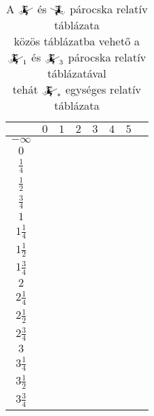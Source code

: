 \documentclass{article}
\newcommand{\blk}{\cellcolor{darkgray}}
\newcommand{\red}{\cellcolor{red!33}}
\newcommand{\grn}{\cellcolor{green!33}}
\newcommand{\nothing}{\text{\raisebox{0.4em}{\rotatebox{180}{$\curvearrowleft$}}}}%
\newcommand{\just}[1]{\boxed{#1}}%
\newcommand{\incl}{\mathbf{incl}}
\newcommand{\excl}{\mathbf{excl}}
\newcommand{\currymainfun}[1]{\mathwitch_{#1}}
\newcommand{\currymainfunA}{\mathwitch}
\newcommand{\currymainfunB}{\reversemathwitch}
\begin{document}
	\begin{table}[H]
		\caption*{A $\currymainfunA$ és $\currymainfunB$ párocska relatív táblázata\\közös táblázatba vehető a $\currymainfun1$ és $\currymainfun3$ párocska relatív táblázatával\\tehát $\currymainfun{*}$ egységes relatív táblázata}
		\centering
		\begin{tabular}{c||c|c|c|c|c|c|c|}
				&	$0$		&	$1$		&	$2$		&	$3$		&	$4$		&	$5$		\\\hline\hline
		$-\infty$	&	\nothing	&	\nothing	&	\nothing	&	\nothing	&	\nothing	&	\nothing	\\\hline
			$0$	&	\nothing	&	\nothing	&	\nothing	&	\nothing	&	\nothing	&	\grn\just\incl	\\\hline
		$\frac14$	&	\nothing	&	\nothing	&	\nothing	&	\nothing	&	\nothing	&	\grn\just\incl	\\\hline
		$\frac12$	&	\red\just\excl	&	\nothing	&	\nothing	&	\nothing	&	\nothing	&	\grn\just\incl	\\\hline
		$\frac34$	&	\red\just\excl	&	\nothing	&	\nothing	&	\nothing	&	\nothing	&	\grn\just\incl	\\\hline
			$1$	&	\red\just\excl	&	\nothing	&	\nothing	&	\nothing	&	\grn\just\incl	&	\blk		\\\hline
		$1\frac14$	&	\red\just\excl	&	\nothing	&	\nothing	&	\nothing	&	\grn\just\incl	&	\blk		\\\hline
		$1\frac12$	&	\blk		&	\red\just\excl	&	\nothing	&	\nothing	&	\grn\just\incl	&	\blk		\\\hline
		$1\frac34$	&	\blk		&	\red\just\excl	&	\nothing	&	\nothing	&	\grn\just\incl	&	\blk		\\\hline
			$2$	&	\blk		&	\red\just\excl	&	\nothing	&	\grn\just\incl	&	\blk		&	\blk		\\\hline
		$2\frac14$	&	\blk		&	\red\just\excl	&	\nothing	&	\grn\just\incl	&	\blk		&	\blk		\\\hline
		$2\frac12$	&	\blk		&	\blk		&	\red\just\excl	&	\grn\just\incl	&	\blk		&	\blk		\\\hline
		$2\frac34$	&	\blk		&	\blk		&	\red\just\excl	&	\grn\just\incl	&	\blk		&	\blk		\\\hline
			$3$	&	\blk		&	\blk		&	\blk		&	\blk		&	\blk		&	\blk		\\\hline
		$3\frac14$	&	\blk		&	\blk		&	\blk		&	\blk		&	\blk		&	\blk		\\\hline
		$3\frac12$	&	\blk		&	\blk		&	\blk		&	\blk		&	\blk		&	\blk		\\\hline
		$3\frac34$	&	\blk		&	\blk		&	\blk		&	\blk		&	\blk		&	\blk		\\\hline
		\end{tabular}
	\end{table}
\end{document}
